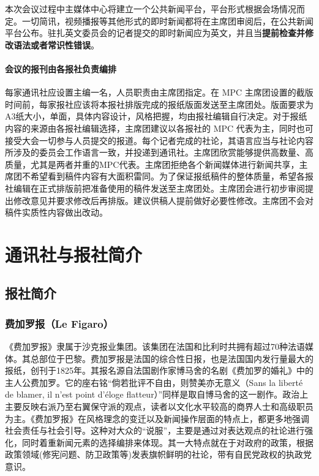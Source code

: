 \documentclass[a4paper,openany]{book}
\begin{document}
本次会议过程中主媒体中心将建立一个公共新闻平台，平台形式根据会场情况而定。一切简讯，视频播报等其他形式的即时新闻都将在主席团审阅后，在公共新闻平台公布。驻扎英文委员会的记者提交的即时新闻应为英文，并且当\textbf{提前检查并修改语法或者常识性错误}。

\subsubsection{会议的报刊由各报社负责编排}

每家通讯社应设置主编一名，人员职责由主席团指定。在 MPC 主席团设置的截版时间前，每家报社应该将本报社排版完成的报纸版面发送至主席团处。版面要求为A3纸大小，单面，具体内容设计，风格把握，均由报社编辑自行决定。对于报纸内容的来源由各报社编辑选择，主席团建议以各报社的 MPC 代表为主，同时也可接受大会一切参与人员提交的报道。每个记者完成的社论，其语言应当与社论内容所涉及的委员会工作语言一致，并投递到通讯社。主席团欣赏能够提供高数量、高质量，尤其是两者并重的MPC代表。主席团拒绝各个新闻媒体进行新闻共享，主席团不希望看到稿件内容有大面积雷同。为了保证报纸稿件的整体质量，希望各报社编辑在正式排版前把准备使用的稿件发送至主席团处。主席团会进行初步审阅提出修改意见并要求修改后再排版。建议供稿人提前做好必要性修改。主席团不会对稿件实质性内容做出改动。


\chapter{通讯社与报社简介}

\section{报社简介}

\subsection{费加罗报（Le Figaro）}

《费加罗报》隶属于沙克报业集团。该集团在法国和比利时共拥有超过70种法语媒体。其总部位于巴黎。费加罗报是法国的综合性日报，也是法国国内发行量最大的报纸，创刊于1825年。其报名源自法国剧作家博马舍的名剧《费加罗的婚礼》中的主人公费加罗。它的座右铭“倘若批评不自由，则赞美亦无意义（Sans la liberté de blamer, il n'est point d'éloge flatteur）”同样是取自博马舍的这一剧作。政治上主要反映右派乃至右翼保守派的观点，读者以文化水平较高的商界人士和高级职员为主。《费加罗报》在风格理念的变迁以及新闻操作层面的特点上，都更多地强调社会责任与社会引导。这种对大众的“说服”，主要是通过对表达观点的社论进行强化，同时着重新闻元素的选择编排来体现。其一大特点就在于对政府的政策，根据政策领域(修宪问题、防卫政策等)发表旗帜鲜明的社论，带有自民党政权的执政党意识。
\end{document}
